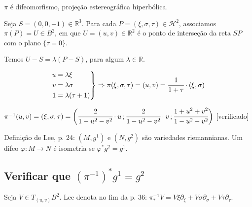 \documentclass[10pt,a4paper]{article}
\begin{document}
		$\pi$ \'e difeomorfismo, proje\c{c}\~ao estereogr\'afica hiperb\'olica.

		Seja $S = (0,0,-1) \in \mathbb{R}^3$. Para cada $P = (\xi, \sigma, \tau) \in \mathcal{H}^2$, associamos $\pi(P) = U \in B^2$, em que $U = (u, v) \in \mathbb{R}^2$ \'e o ponto de interse\c{c}\~ao da reta $SP$ com o plano $\{ \tau = 0 \}$.

		Temos $U - S = \lambda (P - S)$, para algum $\lambda \in \mathbb{R}$.

		\begin{equation*}
			\left.\begin{aligned}
			    u &= \lambda \xi \\
			    v &= \lambda \sigma \\
			    1 &= \lambda (\tau + 1)
			\end{aligned}
			\right\} \Rightarrow \pi(\xi, \sigma, \tau) = (u, v) = \cfrac{1}{1 + \tau} \cdot (\xi, \sigma)
		\end{equation*}

		$\pi^{-1}(u, v) = (\xi, \sigma, \tau) = \bigg( \cfrac{2}{1 - u^2 - v^2} \cdot u \,; \cfrac{2}{1 - u^2 - v^2} \cdot v \,; \cfrac{1 + u^2 + v^2}{1 - u^2 - v^2} \bigg)$ [verificado]

		Defini\c{c}\~ao de Lee, p. 24: $(M, g^1)$ e $(N, g^2)$ s\~ao variedades riemannianas. Um difeo $\varphi: M \rightarrow N$ \'e isometria se $\varphi^* g^2 = g^1$.

		\subsection{Verificar que ${(\pi^{-1})}^* g^1 = g^2$}

		\begin{flushright}
		\end{flushright}

		Seja $V \in T_{(u, v)}B^2$. Lee denota no fim da p. 36: $\pi^{-1}_* V = V\xi \partial_{\xi} + V\sigma \partial_{\sigma} + V\tau \partial_\tau$.
\end{document}
